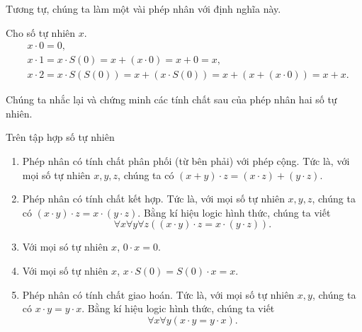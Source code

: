 Tương tự, chúng ta làm một vài phép nhân với định nghĩa này.

\begin{example}
	Cho số tự nhiên $x$.
	\begin{align*}
		 & x \cdot 0 = 0,                                                                 \\
		 & x \cdot 1 = x\cdot S(0) = x + (x\cdot 0) = x + 0 = x,                          \\
		 & x \cdot 2 = x\cdot S(S(0)) = x + (x\cdot S(0)) = x + (x + (x\cdot 0)) = x + x.
	\end{align*}
\end{example}

Chúng ta nhắc lại và chứng minh các tính chất sau của phép nhân hai số tự nhiên.

\begin{theorem}\label{theorem:property-of-natural-numbers-multiplication}
	Trên tập hợp số tự nhiên
	\begin{enumerate}[label={(\roman*)}]
		\item Phép nhân có tính chất phân phối (từ bên phải) với phép cộng. Tức là, với mọi số tự nhiên $x, y, z$, chúng ta có $(x + y)\cdot z = (x\cdot z) + (y\cdot z)$.
		\item Phép nhân có tính chất kết hợp. Tức là, với mọi số tự nhiên $x, y, z$, chúng ta có $(x \cdot y) \cdot z = x \cdot (y \cdot z)$. Bằng kí hiệu logic hình thức, chúng ta viết
		      \[
			      \forall x\forall y\forall z \left( (x \cdot y) \cdot z = x \cdot (y \cdot z) \right).
		      \]
		\item Với mọi só tự nhiên $x$, $0\cdot x = 0$.
		\item Với mọi số tự nhiên $x$, $x\cdot S(0) = S(0) \cdot x = x$.
		\item Phép nhân có tính chất giao hoán.  Tức là, với mọi số tự nhiên $x, y$, chúng ta có $x \cdot y = y \cdot x$. Bằng kí hiệu logic hình thức, chúng ta viết
		      \[
			      \forall x\forall y \left( x \cdot y = y \cdot x \right).
		      \]
	\end{enumerate}
\end{theorem}

